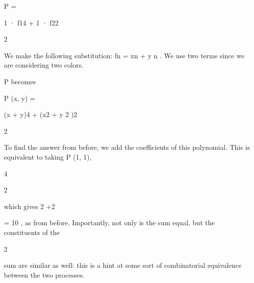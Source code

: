 \documentclass[a4paper,portrait,12pt]{article}
\begin{document}
\begin{flushleft}
P =
\end{flushleft}





\begin{flushleft}
1 · f14 + 1 · f22
\end{flushleft}


2





\begin{flushleft}
We make the following substitution: fn = xn + y n . We use two terms since we are considering two colors.
\end{flushleft}


\begin{flushleft}
P becomes
\end{flushleft}


\begin{flushleft}
P (x, y) =
\end{flushleft}





\begin{flushleft}
(x + y)4 + (x2 + y 2 )2
\end{flushleft}


2





\begin{flushleft}
To find the answer from before, we add the coefficients of this polynomial. This is equivalent to taking P (1, 1),
\end{flushleft}


4


2


\begin{flushleft}
which gives 2 +2
\end{flushleft}


\begin{flushleft}
= 10 , as from before. Importantly, not only is the sum equal, but the constituents of the
\end{flushleft}


2


\begin{flushleft}
sum are similar as well: this is a hint at some sort of combinatorial equivalence between the two processes.
\end{flushleft}
\end{document}
